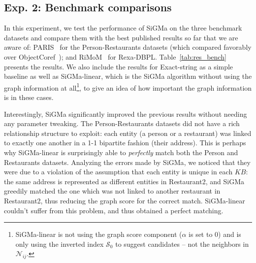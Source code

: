 \documentclass{sig-alternate}
\newcommand{\ts}[1]{\textsf{#1}}
\newcommand{\KB}{K\!B}
\begin{document}
\subsection{Exp. 2: Benchmark comparisons} \label{sec:exp2}
In this experiment, we test the performance of \ts{SiGMa} on the three benchmark datasets and compare them with the best published results so far that we are aware of: \ts{PARIS}~\cite{suchanek12PARIS} for the Person-Restaurants datasets (which compared favorably over ObjectCoref~\cite{hu11objectCoref}); and \ts{RiMoM}~\cite{li09RiMOM} for \ts{Rexa-DBPL}. Table~\ref{tab:res_bench} presents the results. We also include the results for \ts{Exact-string} as a simple baseline as well as \ts{SiGMa-linear}, which is the \ts{SiGMa} algorithm without using the graph information at all\footnote{\ts{SiGMa-linear} is not using the graph score component ($\alpha$ is set to 0) and is only using the inverted index $\mathcal{S}_0$ to suggest candidates -- not the neighbors in $\mathcal{N}_{ij}$.}, to give an idea of how important the graph information is in these cases.

Interestingly, \ts{SiGMa} significantly improved the previous results without needing any parameter tweaking. The Person-Restaurants datasets did not have a rich relationship structure to exploit: each entity (a person or a restaurant) was linked to exactly one another in a 1-1 bipartite fashion (their address). This is perhaps why \ts{SiGMa-linear} is surprisingly able to \emph{perfectly} match both the Person and Restaurants datasets. Analyzing the errors made by \ts{SiGMa}, we noticed that they were due to a violation of the assumption that each entity is unique in each $\KB$: the same address is represented as different entities in \ts{Restaurant2}, and \ts{SiGMa} greedily matched the one which was not linked to another restaurant in \ts{Restaurant2}, thus reducing the graph score for the correct match. \ts{SiGMa-linear} couldn't suffer from this problem, and thus obtained a perfect matching.
%
%
\end{document}
